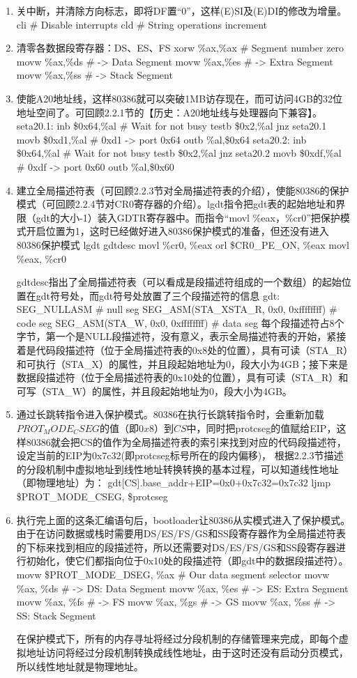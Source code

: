 \begin{enumerate}
\def\labelenumi{\arabic{enumi}.}
\item
  关中断，并清除方向标志，即将DF置``0''，这样(E)SI及(E)DI的修改为增量。
  cli \# Disable interrupts cld \# String operations increment
\item
  清零各数据段寄存器：DS、ES、FS xorw \%ax,\%ax \# Segment number zero
  movw \%ax,\%ds \# -\textgreater{} Data Segment movw \%ax,\%es \#
  -\textgreater{} Extra Segment movw \%ax,\%ss \# -\textgreater{} Stack
  Segment
\item
  使能A20地址线，这样80386就可以突破1MB访存现在，而可访问4GB的32位地址空间了。可回顾2.2.1节的【历史：A20地址线与处理器向下兼容】。
  seta20.1: inb \$0x64,\%al \# Wait for not busy testb \$0x2,\%al jnz
  seta20.1 movb \$0xd1,\%al \# 0xd1 -\textgreater{} port 0x64 outb
  \%al,\$0x64 seta20.2: inb \$0x64,\%al \# Wait for not busy testb
  \$0x2,\%al jnz seta20.2 movb \$0xdf,\%al \# 0xdf -\textgreater{} port
  0x60 outb \%al,\$0x60
\item
  建立全局描述符表（可回顾2.2.3节对全局描述符表的介绍），使能80386的保护模式（可回顾2.2.4节对CR0寄存器的介绍）。lgdt指令把gdt表的起始地址和界限（gdt的大小-1）装入GDTR寄存器中。而指令``movl
  \%eax，\%cr0''把保护模式开启位置为1，这时已经做好进入80386保护模式的准备，但还没有进入80386保护模式
  lgdt gdtdesc movl \%cr0, \%eax orl \$CR0\_PE\_ON, \%eax movl \%eax,
  \%cr0

  gdtdesc指出了全局描述符表（可以看成是段描述符组成的一个数组）的起始位置在gdt符号处，而gdt符号处放置了三个段描述符的信息
  gdt: SEG\_NULLASM \# null seg SEG\_ASM(STA\_X\textbar{}STA\_R, 0x0,
  0xffffffff) \# code seg SEG\_ASM(STA\_W, 0x0, 0xffffffff) \# data seg
  每个段描述符占8个字节，第一个是NULL段描述符，没有意义，表示全局描述符表的开始，紧接着是代码段描述符（位于全局描述符表的0x8处的位置），具有可读（STA\_R）和可执行（STA\_X）的属性，并且段起始地址为0，段大小为4GB；接下来是数据段描述符（位于全局描述符表的0x10处的位置），具有可读（STA\_R）和可写（STA\_W）的属性，并且段起始地址为0，段大小为4GB。
\item
  通过长跳转指令进入保护模式。80386在执行长跳转指令时，会重新加载\(PROT_MODE_CSEG的值（即0x8）到CS中，同时把\)protcseg的值赋给EIP，这样80386就会把CS的值作为全局描述符表的索引来找到对应的代码段描述符，设定当前的EIP为0x7c32(即protcseg标号所在的段内偏移)，
  根据2.2.3节描述的分段机制中虚拟地址到线性地址转换转换的基本过程，可以知道线性地址（即物理地址）为：
  gdt{[}CS{]}.base\_addr+EIP=0x0+0x7c32=0x7c32 ljmp \$PROT\_MODE\_CSEG,
  \$protcseg
\item
  执行完上面的这条汇编语句后，bootloader让80386从实模式进入了保护模式。由于在访问数据或栈时需要用DS/ES/FS/GS和SS段寄存器作为全局描述符表的下标来找到相应的段描述符，所以还需要对DS/ES/FS/GS和SS段寄存器进行初始化，使它们都指向位于0x10处的段描述符（即gdt中的数据段描述符）。
  movw \$PROT\_MODE\_DSEG, \%ax \# Our data segment selector movw \%ax,
  \%ds \# -\textgreater{} DS: Data Segment movw \%ax, \%es \#
  -\textgreater{} ES: Extra Segment movw \%ax, \%fs \# -\textgreater{}
  FS movw \%ax, \%gs \# -\textgreater{} GS movw \%ax, \%ss \#
  -\textgreater{} SS: Stack Segment

  在保护模式下，所有的内存寻址将经过分段机制的存储管理来完成，即每个虚拟地址访问将经过分段机制转换成线性地址，由于这时还没有启动分页模式，所以线性地址就是物理地址。
\end{enumerate}
